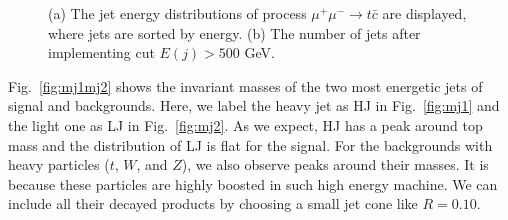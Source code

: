 \documentclass[a4paper,11pt]{article}
\begin{document}
\begin{figure}[htbp]
  \centering
  \caption{(a) The jet energy distributions of process $\mu^+\mu^-\to t\bar{c}$ are displayed, where jets are sorted by energy. (b) The number of jets after implementing cut $E(j)>500$ GeV.}\label{fig:base}
\end{figure}

Fig.~\ref{fig:mj1mj2} shows the invariant masses of the two most energetic jets of signal and backgrounds. 
Here, we label the heavy jet as HJ in Fig.~\ref{fig:mj1} and the light one as LJ in Fig.~\ref{fig:mj2}.
As we expect, HJ has a peak around top mass and the distribution of LJ is flat for the signal.
For the backgrounds with heavy particles ($t$, $W$, and $Z$), we also observe peaks around their masses. 
It is because these particles are highly boosted in such high energy machine. 
We can include all their decayed products by choosing a small jet cone like $R=0.10$.
\end{document}
